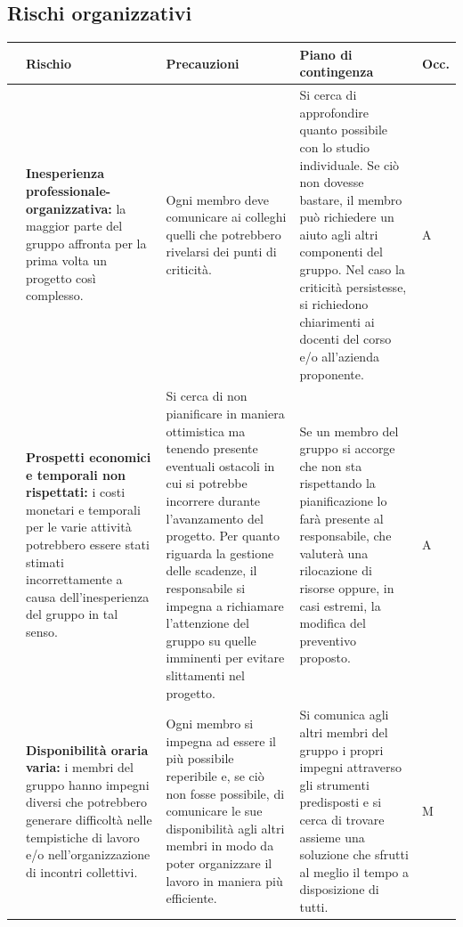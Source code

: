 \subsection{Rischi organizzativi}\label{sec:analisi_rischi:org}
\renewcommand{\arraystretch}{1.5}
\begin{xltabular}{\textwidth}{p{0.00001\textwidth} X | X | X | p{0.05\textwidth}}

    & \textbf{\color{white} Rischio} & \textbf{\color{white} Precauzioni} & \textbf{\color{white} Piano di contingenza} & \textbf{\color{white} Occ.}\\ 
    \hline
    \endhead
    
    & \textbf{Inesperienza professionale-organizzativa:} la maggior parte del gruppo affronta per la prima volta un progetto così complesso.
    & Ogni membro deve comunicare ai colleghi quelli che potrebbero rivelarsi dei punti di criticità.
    & Si cerca di approfondire quanto possibile con lo studio individuale. Se ciò non dovesse bastare, il membro può richiedere un aiuto agli altri componenti del gruppo. Nel caso la criticità persistesse, si richiedono chiarimenti ai docenti del corso e/o all'azienda proponente.
    & A \\
    \hline

    & \textbf{Prospetti economici e temporali non rispettati: } i costi monetari e temporali per le varie attività potrebbero essere stati stimati incorrettamente a causa dell'inesperienza del gruppo in tal senso.
    & Si cerca di non pianificare in maniera ottimistica ma tenendo presente eventuali ostacoli in cui si potrebbe incorrere durante l'avanzamento del progetto. Per quanto riguarda la gestione delle scadenze, il responsabile si impegna a richiamare l'attenzione del gruppo su quelle imminenti per evitare slittamenti nel progetto.
    & Se un membro del gruppo si accorge che non sta rispettando la pianificazione lo farà presente al responsabile, che valuterà una rilocazione di risorse oppure, in casi estremi, la modifica del preventivo proposto.
    & A \\
    \hline
    
    & \textbf{Disponibilità oraria varia:} i membri del gruppo hanno impegni diversi che potrebbero generare difficoltà nelle tempistiche di lavoro e/o nell'organizzazione di incontri collettivi.
    & Ogni membro si impegna ad essere il più possibile reperibile e, se ciò non fosse possibile, di comunicare le sue disponibilità agli altri membri in modo da poter organizzare il lavoro in maniera più efficiente.
    & Si comunica agli altri membri del gruppo i propri impegni attraverso gli strumenti predisposti e si cerca di trovare assieme una soluzione che sfrutti al meglio il tempo a disposizione di tutti.
    & M \\
    \hline


\end{xltabular}
